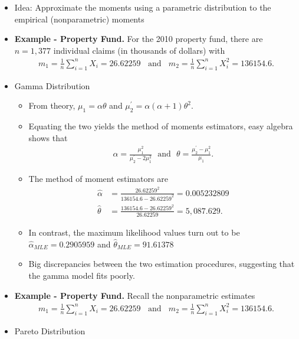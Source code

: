\documentclass[]{book}
\begin{document}
\begin{itemize}
\item
  Idea: Approximate the moments using a parametric distribution to the
  empirical (nonparametric) moments
\item
  \textbf{Example - Property Fund.} For the 2010 property fund, there
  are \(n=1,377\) individual claims (in thousands of dollars) with
  \[\begin{aligned}
  m_1 = \frac{1}{n} \sum_{i=1}^n X_i = 26.62259 \ \ \ \
  \text{and} \ \ \ \
   m_2 = \frac{1}{n} \sum_{i=1}^n X_i^2 = 136154.6 .\end{aligned}\]
\item
  Gamma Distribution

  \begin{itemize}
  \item
    From theory, \(\mu_1 = \alpha \theta\) and
    \(\mu_2^{\prime} = \alpha(\alpha+1) \theta^2\).
  \item
    Equating the two yields the method of moments estimators, easy
    algebra shows that \[\begin{aligned}
    \alpha = \frac{\mu_1^2}{\mu_2^{\prime}-2\mu_1^2}  \ \ \ \text{and} \ \ \  \theta = \frac{\mu_2^{\prime}-\mu_1^2}{\mu_1}.\end{aligned}\]
  \item
    The method of moment estimators are \[\begin{aligned}
    \hat{\alpha} &= \frac{26.62259^2}{136154.6-26.62259^2} = 0.005232809\\
    \hat{\theta} &= \frac{136154.6-26.62259^2}{26.62259} = 5,087.629.\end{aligned}\]
  \item
    In contrast, the maximum likelihood values turn out to be
    \(\hat{\alpha}_{MLE} = 0.2905959\) and
    \(\hat{\theta}_{MLE} = 91.61378\)
  \item
    Big discrepancies between the two estimation procedures, suggesting
    that the gamma model fits poorly.
  \end{itemize}
\item
  \textbf{Example - Property Fund.} Recall the nonparametric estimates
  \[\begin{aligned}
  m_1 = \frac{1}{n} \sum_{i=1}^n X_i = 26.62259 \ \ \ \
  \text{and} \ \ \ \
   m_2 = \frac{1}{n} \sum_{i=1}^n X_i^2 = 136154.6 .\end{aligned}\]
\item
  Pareto Distribution


\end{itemize}
\end{document}
